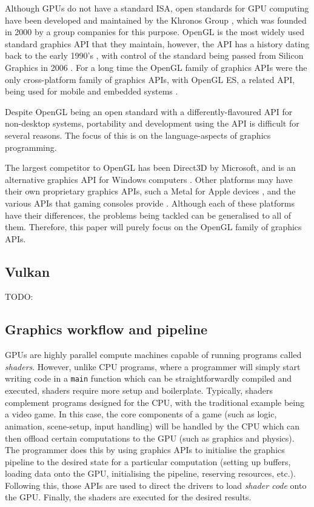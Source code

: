 \documentclass[a4paper,12pt,twoside,openright]{report}
\begin{document}
Although GPUs do not have a standard ISA, open standards for GPU computing have
been developed and maintained by the Khronos Group \cite{TODO}, which was
founded in 2000 by a group companies for this purpose. OpenGL is the most
widely used standard graphics API that they maintain, however, the API has a
history dating back to the early 1990's \cite{TODO}, with control of the
standard being passed from Silicon Graphics in 2006 \cite{TODO}. For a long
time the OpenGL family of graphics APIs were the only cross-platform family of
graphics APIs, with OpenGL ES, a related API, being used for mobile and
embedded systems \cite{TODO}.

Despite OpenGL being an open standard with a differently-flavoured API for
non-desktop systems, portability and development using the API is difficult for
several reasons. The focus of this is on the language-aspects of graphics
programming.

The largest competitor to OpenGL has been Direct3D by Microsoft, and is an
alternative graphics API for Windows computers \cite{TODO}. Other platforms may
have their own proprietary graphics APIs, such a Metal for Apple devices
\cite{TODO}, and the various APIs that gaming consoles provide \cite{TODO}.
Although each of these platforms have their differences, the problems being
tackled can be generalised to all of them. Therefore, this paper will purely
focus on the OpenGL family of graphics APIs.

\subsection{Vulkan}

TODO:

\subsection{Graphics workflow and pipeline}

GPUs are highly parallel compute machines capable of running programs called
\textit{shaders}. However, unlike CPU programs, where a programmer will simply
start writing code in a \texttt{main} function which can be straightforwardly
compiled and executed, shaders require more setup and boilerplate. Typically,
shaders complement programs designed for the CPU, with the traditional example
being a video game. In this case, the core components of a game (such as logic,
animation, scene-setup, input handling) will be handled by the CPU which can
then offload certain computations to the GPU (such as graphics and physics).
The programmer does this by using graphics APIs to initialise the graphics
pipeline to the desired state for a particular computation (setting up buffers,
loading data onto the GPU, initialising the pipeline, reserving resources,
etc.). Following this, those APIs are used to direct the drivers to load
\textit{shader code} onto the GPU. Finally, the shaders are executed for the
desired results.
\end{document}

